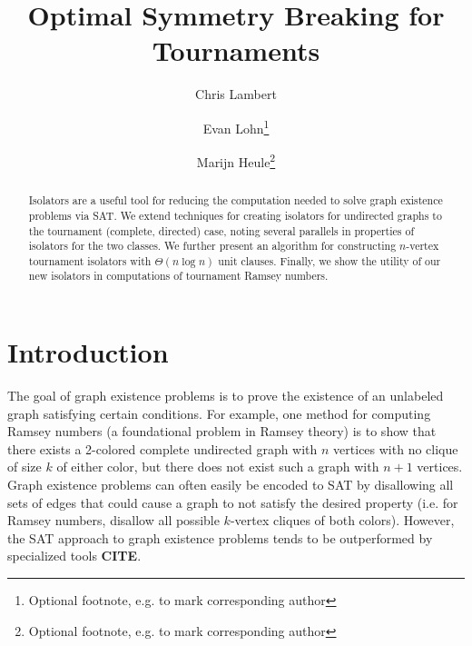 \documentclass[a4paper,UKenglish,cleveref, autoref, thm-restate]{lipics-v2021}
\title{Optimal Symmetry Breaking for Tournaments}
\author{Chris Lambert}{Dummy University Computing Laboratory, [optional: Address], Country \and My second affiliation, Country \and \url{http://www.myhomepage.edu} }{johnqpublic@dummyuni.org}{}{(Optional) author-specific funding acknowledgements}%
\author{Evan Lohn\footnote{Optional footnote, e.g. to mark corresponding author}}{Department of Informatics, Dummy College, [optional: Address], Country}{joanrpublic@dummycollege.org}{}{[funding]}
\author{Marijn Heule\footnote{Optional footnote, e.g. to mark corresponding author}}{Department of Informatics, Dummy College, [optional: Address], Country}{joanrpublic@dummycollege.org}{}{[funding]}
\begin{document}
\maketitle

%
\begin{abstract}

Isolators are a useful tool for reducing the computation needed to solve graph existence problems via SAT.  We extend techniques for creating isolators for undirected graphs to the tournament (complete, directed) case, noting several parallels in properties of isolators for the two classes. We further present an algorithm for constructing $n$-vertex tournament isolators with $\Theta(n \log n)$ unit clauses. Finally, we show the utility of our new isolators in computations of tournament Ramsey numbers.

\end{abstract}
%
%



\section{Introduction}


The goal of graph existence problems is to prove the existence of an unlabeled graph satisfying certain conditions. For example, one method for computing Ramsey numbers (a foundational problem in Ramsey theory) is to show that there exists a 2-colored complete undirected graph with $n$ vertices with no clique of size $k$ of either color, but there does not exist such a graph with $n+1$ vertices. Graph existence problems can often easily be encoded to SAT by disallowing all sets of edges that could cause a graph to not satisfy the desired property (i.e. for Ramsey numbers, disallow all possible $k$-vertex cliques of both colors). However, the SAT approach to graph existence problems tends to be outperformed by specialized tools \textbf{CITE}. 
\end{document}

